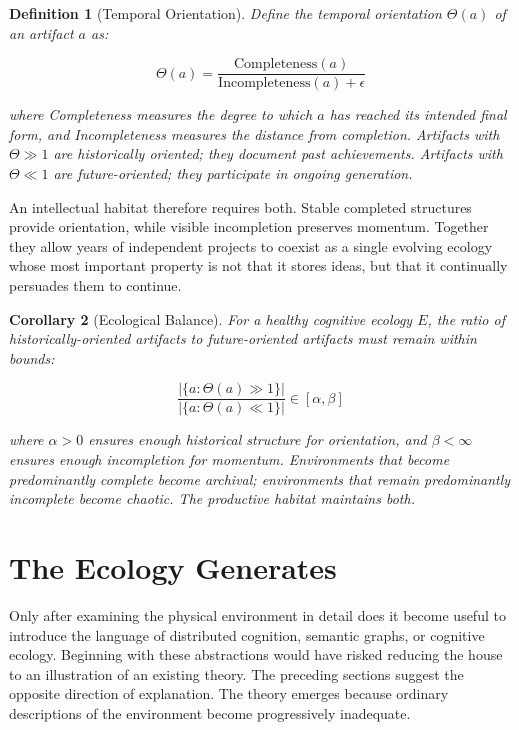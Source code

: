 \documentclass[12pt,oneside]{article}
\newtheorem{definition}{Definition}[section]
\newtheorem{corollary}[definition]{Corollary}
\theoremstyle{remark}
\begin{document}
\begin{definition}[Temporal Orientation]
Define the temporal orientation $\Theta(a)$ of an artifact $a$ as:

\begin{equation}
\Theta(a) = \frac{\text{Completeness}(a)}{\text{Incompleteness}(a) + \epsilon}
\end{equation}

where Completeness measures the degree to which $a$ has reached its intended final form, and Incompleteness measures the distance from completion. Artifacts with $\Theta \gg 1$ are historically oriented; they document past achievements. Artifacts with $\Theta \ll 1$ are future-oriented; they participate in ongoing generation.
\end{definition}

An intellectual habitat therefore requires both. Stable completed structures provide orientation, while visible incompletion preserves momentum. Together they allow years of independent projects to coexist as a single evolving ecology whose most important property is not that it stores ideas, but that it continually persuades them to continue.

\begin{corollary}[Ecological Balance]
For a healthy cognitive ecology $E$, the ratio of historically-oriented artifacts to future-oriented artifacts must remain within bounds:

\begin{equation}
\frac{|\{a : \Theta(a) \gg 1\}|}{|\{a : \Theta(a) \ll 1\}|} \in [\alpha, \beta]
\end{equation}

where $\alpha > 0$ ensures enough historical structure for orientation, and $\beta < \infty$ ensures enough incompletion for momentum. Environments that become predominantly complete become archival; environments that remain predominantly incomplete become chaotic. The productive habitat maintains both.
\end{corollary}


\section{The Ecology Generates}

Only after examining the physical environment in detail does it become useful to introduce the language of distributed cognition, semantic graphs, or cognitive ecology. Beginning with these abstractions would have risked reducing the house to an illustration of an existing theory. The preceding sections suggest the opposite direction of explanation. The theory emerges because ordinary descriptions of the environment become progressively inadequate.
\end{document}
